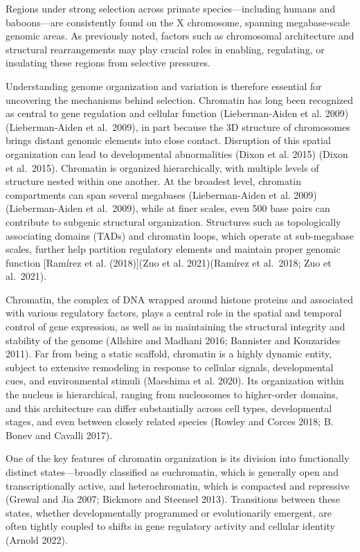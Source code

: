 \documentclass[
  a4paper,
  openany]{scrbook}
\begin{document}
Regions under strong selection across primate species---including humans
and baboons---are consistently found on the X chromosome, spanning
megabase-scale genomic areas. As previously noted, factors such as
chromosomal architecture and structural rearrangements may play crucial
roles in enabling, regulating, or insulating these regions from
selective pressures.

Understanding genome organization and variation is therefore essential
for uncovering the mechanisms behind selection. Chromatin has long been
recognized as central to gene regulation and cellular function
(Lieberman-Aiden et al. 2009) (Lieberman-Aiden et al.~2009), in part
because the 3D structure of chromosomes brings distant genomic elements
into close contact. Disruption of this spatial organization can lead to
developmental abnormalities (Dixon et al. 2015) (Dixon et al.~2015).
Chromatin is organized hierarchically, with multiple levels of structure
nested within one another. At the broadest level, chromatin compartments
can span several megabases (Lieberman-Aiden et al. 2009)
(Lieberman-Aiden et al.~2009), while at finer scales, even 500 base
pairs can contribute to subgenic structural organization. Structures
such as topologically associating domains (TADs) and chromatin loops,
which operate at sub-megabase scales, further help partition regulatory
elements and maintain proper genomic function {[}Ramírez et al.
(2018){]}(Zuo et al. 2021)(Ramírez et al.~2018; Zuo et al.~2021).

Chromatin, the complex of DNA wrapped around histone proteins and
associated with various regulatory factors, plays a central role in the
spatial and temporal control of gene expression, as well as in
maintaining the structural integrity and stability of the genome
(Allshire and Madhani 2016; Bannister and Kouzarides 2011). Far from
being a static scaffold, chromatin is a highly dynamic entity, subject
to extensive remodeling in response to cellular signals, developmental
cues, and environmental stimuli (Maeshima et al. 2020). Its organization
within the nucleus is hierarchical, ranging from nucleosomes to
higher-order domains, and this architecture can differ substantially
across cell types, developmental stages, and even between closely
related species (Rowley and Corces 2018; B. Bonev and Cavalli 2017).

One of the key features of chromatin organization is its division into
functionally distinct states---broadly classified as euchromatin, which
is generally open and transcriptionally active, and heterochromatin,
which is compacted and repressive (Grewal and Jia 2007; Bickmore and
Steensel 2013). Transitions between these states, whether
developmentally programmed or evolutionarily emergent, are often tightly
coupled to shifts in gene regulatory activity and cellular identity
(Arnold 2022).
\end{document}

